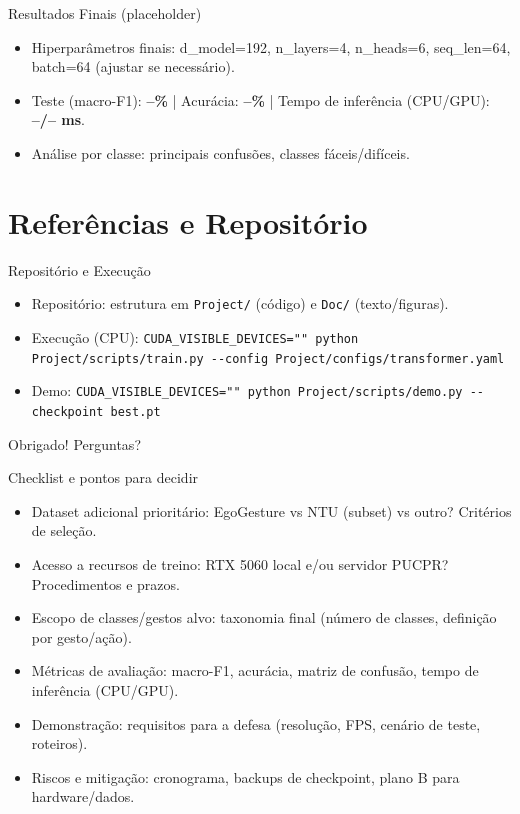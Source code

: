 \documentclass[aspectratio=169]{beamer}
\begin{document}
\begin{frame}{Resultados Finais (placeholder)}
  \begin{itemize}
    \item Hiperparâmetros finais: d\_model=192, n\_layers=4, n\_heads=6, seq\_len=64, batch=64 (ajustar se necessário).
    \item Teste (macro-F1): \textbf{--\%} | Acurácia: \textbf{--\%} | Tempo de inferência (CPU/GPU): \textbf{--/-- ms}.
    \item Análise por classe: principais confusões, classes fáceis/difíceis.
  \end{itemize}
\end{frame}

\section{Referências e Repositório}
\begin{frame}{Repositório e Execução}
  \begin{itemize}
    \item Repositório: estrutura em \texttt{Project/} (código) e \texttt{Doc/} (texto/figuras).
    \item Execução (CPU): \verb|CUDA_VISIBLE_DEVICES="" python Project/scripts/train.py --config Project/configs/transformer.yaml|
    \item Demo: \verb|CUDA_VISIBLE_DEVICES="" python Project/scripts/demo.py --checkpoint best.pt|
  \end{itemize}
\end{frame}

\begin{frame}[standout]
  Obrigado! \newline Perguntas?
\end{frame}

\begin{frame}{Checklist e pontos para decidir}
  \begin{itemize}
    \item Dataset adicional prioritário: EgoGesture vs NTU (subset) vs outro? Critérios de seleção.
    \item Acesso a recursos de treino: RTX 5060 local e/ou servidor PUCPR? Procedimentos e prazos.
    \item Escopo de classes/gestos alvo: taxonomia final (número de classes, definição por gesto/ação).
    \item Métricas de avaliação: macro-F1, acurácia, matriz de confusão, tempo de inferência (CPU/GPU).
    \item Demonstração: requisitos para a defesa (resolução, FPS, cenário de teste, roteiros).
    \item Riscos e mitigação: cronograma, backups de checkpoint, plano B para hardware/dados.
  \end{itemize}
\end{frame}
\end{document}
